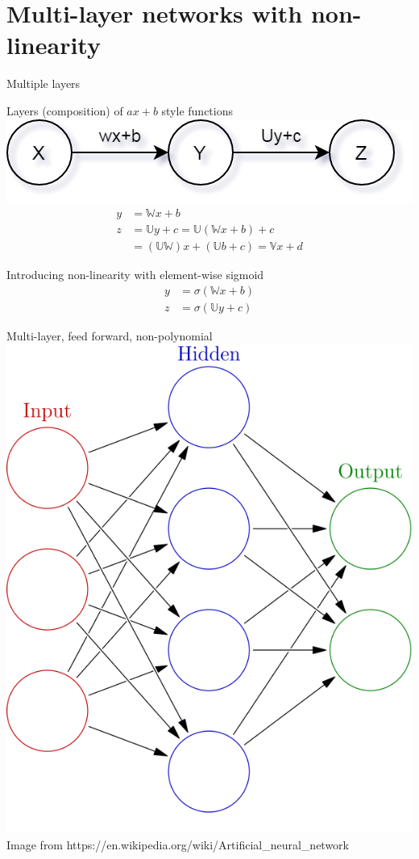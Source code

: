 \section{Multi-layer networks with non-linearity}
\begin{frame}{Multiple layers}
	\begin{block}{Layers (composition) of $ax+b$ style functions}
		\includegraphics[width=.5\textwidth, center]{figuras/two_layer_simple.png}
		\begin{align*}
		y &= \mathbb{W} x + b  \\
		z &= \mathbb{U} y + c =\mathbb{U}(\mathbb{W}x+b)+c \\
		  &= (\mathbb{U}\mathbb{W})x + (\mathbb{U}b+c) = \mathbb{V}x+d 
		\end{align*}
	\end{block}
	\begin{block}{Introducing non-linearity with element-wise sigmoid}
		\begin{align*}
		y &= \sigma(\mathbb{W} x + b) \\ 
		z &= \sigma(\mathbb{U} y + c) 
		\end{align*}
	\end{block}
\end{frame}

\begin{frame}{Multi-layer, feed forward, non-polynomial}
\includegraphics[width=.4\textwidth, center]{figuras/Colored_neural_network_1_hidden.png}
\tiny{Image from https://en.wikipedia.org/wiki/Artificial\_neural\_network }	
\end{frame}

